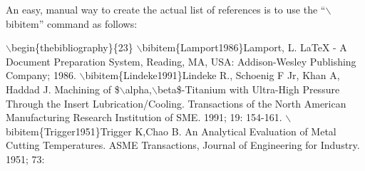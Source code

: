\documentclass[letterpaper,10pt,twocolumn]{../aspe}
\begin{document}
An easy, manual way to create the actual list of references is to use the
``$\backslash$bibitem'' command as follows:
{\topsep=0pt
\begin{flushleft}
    \hspace*{3mm}$\backslash$begin\{thebibliography\}\{23\}\linebreak
    \hspace*{3mm}$\backslash$bibitem\{Lamport1986\}Lamport, L.\linebreak
    \hspace*{6mm} LaTeX - A Document Preparation System,\linebreak
    \hspace*{6mm} Reading, MA, USA: Addison-Wesley\linebreak
    \hspace*{6mm} Publishing Company; 1986.\linebreak
    \hspace*{3mm}$\backslash$bibitem\{Lindeke1991\}Lindeke R.,\linebreak
    \hspace*{6mm} Schoenig F Jr, Khan A, Haddad J.\linebreak
    \hspace*{6mm} Machining of \$$\backslash$alpha,$\backslash$beta\$-Titanium
        \linebreak
        \hspace*{6mm} with Ultra-High Pressure Through the Insert\linebreak
        \hspace*{6mm} Lubrication/Cooling. Transactions of the\linebreak
        \hspace*{6mm} North American Manufacturing Research\linebreak
        \hspace*{6mm} Institution of SME. 1991; 19: 154-161.\linebreak
        \hspace*{3mm}$\backslash$bibitem\{Trigger1951\}Trigger K,Chao B.\linebreak
        \hspace*{6mm} An Analytical Evaluation of Metal Cutting\linebreak
        \hspace*{6mm} Temperatures. ASME Transactions, Journal\linebreak
        \hspace*{6mm} of Engineering for Industry. 1951; 73:\linebreak

\end{flushleft}}
\end{document}
